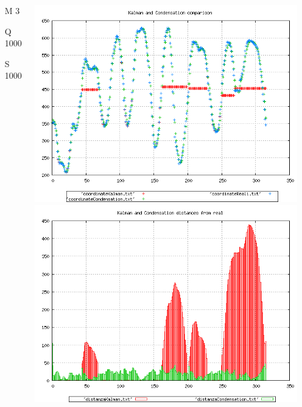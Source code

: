 \documentclass{beamer}
\begin{document}
{\begin{columns}
\begin{scriptsize}
\begin{itemize}
\item [M]3
\item [Q]1000
\item [S]1000
\end{itemize}
\end{scriptsize}
\includegraphics[scale=0.1]{../esperimenti/movie12/mod_3-Q_1000-S_1000/plot.png}\\
\includegraphics[scale=0.1]{../esperimenti/movie12/mod_3-Q_1000-S_1000/plot-distances.png}


\end{columns}}
\end{document}
